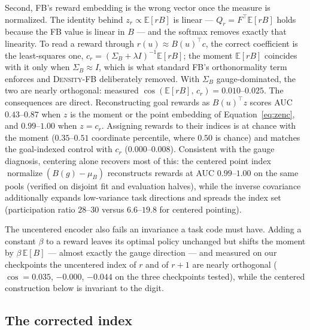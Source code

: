 \documentclass{article}
\newcommand{\E}{\mathbb{E}}
\newcommand{\DensityFB}{\textsc{Density-FB}}
\begin{document}
Second, FB's reward embedding is the wrong vector once the measure is normalized.
The identity behind $z_r\propto\E[rB]$ is linear --- $Q_r = F^\top \E[rB]$ holds because the FB value is linear in $B$ --- and the softmax removes exactly that linearity.
To read a reward through $r(u)\approx B(u)^\top c$, the correct coefficient is the least-squares one,
$c_r = (\Sigma_B+\lambda I)^{-1}\E[rB]$;
the moment $\E[rB]$ coincides with it only when $\Sigma_B\approx I$, which is what standard FB's orthonormality term enforces and \DensityFB{} deliberately removed.
With $\Sigma_B$ gauge-dominated, the two are nearly orthogonal: measured $\cos\!\left(\E[rB],\,c_r\right) = 0.010$--$0.025$.
The consequences are direct.
Reconstructing goal rewards as $B(u)^\top z$ scores AUC $0.43$--$0.87$ when $z$ is the moment or the point embedding of Equation~\ref{eq:zenc}, and $0.99$--$1.00$ when $z=c_r$.
Assigning rewards to their indices is at chance with the moment ($0.35$--$0.51$ coordinate percentile, where $0.50$ is chance) and matches the goal-indexed control with $c_r$ ($0.000$--$0.008$).
Consistent with the gauge diagnosis, centering alone recovers most of this: the centered point index $\operatorname{normalize}(B(g)-\mu_B)$ reconstructs rewards at AUC $0.99$--$1.00$ on the same pools (verified on disjoint fit and evaluation halves), while the inverse covariance additionally expands low-variance task directions and spreads the index set (participation ratio $28$--$30$ versus $6.6$--$19.8$ for centered pointing).

The uncentered encoder also fails an invariance a task code must have.
Adding a constant $\beta$ to a reward leaves its optimal policy unchanged but shifts the moment by $\beta\,\E[B]$ --- almost exactly the gauge direction --- and measured on our checkpoints the uncentered index of $r$ and of $r+1$ are nearly orthogonal ($\cos = 0.035$, $-0.000$, $-0.044$ on the three checkpoints tested), while the centered construction below is invariant to the digit.

\subsection{The corrected index}
\end{document}
